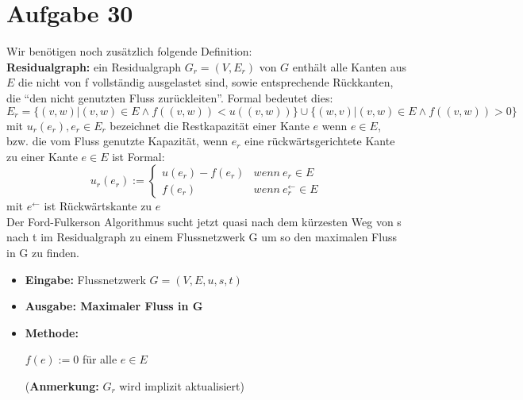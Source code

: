 \documentclass[10pt,a4paper]{article}
\begin{document}
\section*{Aufgabe 30}

Wir benötigen noch zusätzlich folgende Definition:
\\ \textbf{Residualgraph: } ein Residualgraph $G_r = (V, E_r)$ von $G$ enthält alle
    Kanten aus $E$ die nicht von f vollständig ausgelastet sind, sowie entsprechende Rückkanten,
    die ``den nicht genutzten Fluss zurückleiten''. Formal bedeutet dies:
    $$
        E_r = \{(v,w) | (v,w) \in E \wedge f((v,w)) < u((v,w))\} \cup \{ (w,v) | (v,w) \in E  \wedge f((v,w)) > 0  \}
    $$
    mit $u_r(e_r), e_r \in E_r$ bezeichnet die Restkapazität einer Kante $e$ wenn $e \in E$,
    bzw. die vom Fluss genutzte Kapazität, wenn $e_r$ eine rückwärtsgerichtete
    Kante zu einer Kante $e \in E$ ist
    Formal:
    $$
        u_r(e_r) :=  \begin{cases}
                            u(e_r ) - f(e_r)  & wenn \: e_r \in E \\
                            f(e_r) & wenn \: e_r^{\leftarrow} \in E
                          \end{cases} 
    $$
    mit $e^{\leftarrow}$ ist Rückwärtskante zu $e$ \\
    
    Der Ford-Fulkerson Algorithmus sucht jetzt quasi nach dem kürzesten Weg
    von s nach t im Residualgraph zu einem Flussnetzwerk G um so 
    den maximalen Fluss in G zu finden.
    \begin{itemize}
        \item \textbf{Eingabe: } Flussnetzwerk $G = (V,E, u,s,t)$
        \item \textbf{Ausgabe: Maximaler Fluss in G} 
        \item \textbf{Methode: } \\
            \begin{algorithm}[H]
                $f(e) := 0$ für alle $e \in E$\;
            \end{algorithm}
           (\textbf{Anmerkung:} $G_r$ wird implizit aktualisiert)


    \end{itemize}
    
\end{document}
